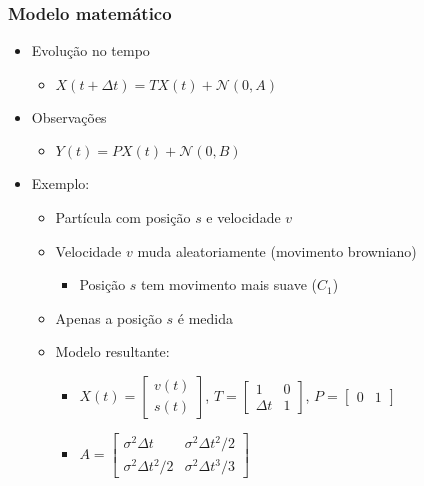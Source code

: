 \documentclass{beamer}
\begin{document}
\begin{frame}\frametitle{Modelo matemático}
\begin{itemize}
	\item \pause  Evolução no tempo
	\begin{itemize}
		\item $X(t+ \Delta t) = TX(t) + \mathcal N(0, A)$
	\end{itemize}
	\item Observações
	\begin{itemize}
		\item $Y(t) = PX(t) + \mathcal N(0, B)$
	\end{itemize}
	\item \pause  Exemplo:
	\begin{itemize}
		\item Partícula com posição $s$ e velocidade $v$
		\item Velocidade $v$ muda aleatoriamente (movimento browniano)
		\begin{itemize}
			\item Posição $s$ tem movimento mais suave ($C_1$)
		\end{itemize}
		\item Apenas a posição $s$ é medida
		\item \pause  Modelo resultante:
		\begin{itemize}
			\item $X(t) = \left[\begin{matrix} v(t) \\ s(t) \end{matrix}\right]$, $T = \left[\begin{matrix} 1 & 0 \\ \Delta t & 1 \end{matrix}\right]$, $P = \left[\begin{matrix} 0 & 1 \end{matrix}\right]$
			\item $A = \left[\begin{matrix} \sigma^2 \Delta t & \sigma^2 \Delta t^2/2 \\ \sigma^2 \Delta t^2/2 & \sigma^2 \Delta t^3/3 \end{matrix}\right]$
		\end{itemize}
	\end{itemize}
\end{itemize}
\end{frame}
\end{document}
